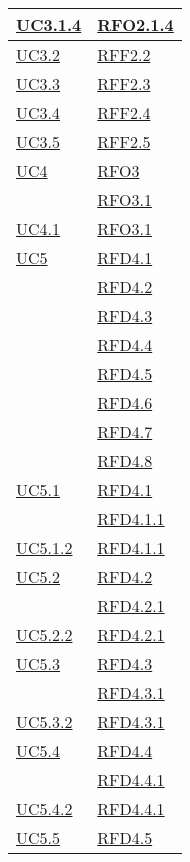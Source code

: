 \begin{longtable}{|>{\centering}m{5cm}|m{5cm}<{\centering}|}
\hyperref[UC3.1.4]{UC3.1.4} & \hyperlink{RFO2.1.4}{RFO2.1.4}\\ \hline
\hyperref[UC3.2]{UC3.2} & \hyperlink{RFF2.2}{RFF2.2}\\ \hline
\hyperref[UC3.3]{UC3.3} & \hyperlink{RFF2.3}{RFF2.3}\\ \hline
\hyperref[UC3.4]{UC3.4} & \hyperlink{RFF2.4}{RFF2.4}\\ \hline
\hyperref[UC3.5]{UC3.5} & \hyperlink{RFF2.5}{RFF2.5}\\ \hline
\hyperref[UC4]{UC4} & \hyperlink{RFO3}{RFO3}\\
& \hyperlink{RFO3.1}{RFO3.1}\\ \hline
\hyperref[UC4.1]{UC4.1} & \hyperlink{RFO3.1}{RFO3.1}\\ \hline
\hyperref[UC5]{UC5} & \hyperlink{RFD4.1}{RFD4.1}\\
& \hyperlink{RFD4.2}{RFD4.2}\\
& \hyperlink{RFD4.3}{RFD4.3}\\
& \hyperlink{RFD4.4}{RFD4.4}\\
& \hyperlink{RFD4.5}{RFD4.5}\\
& \hyperlink{RFD4.6}{RFD4.6}\\
& \hyperlink{RFD4.7}{RFD4.7}\\
& \hyperlink{RFD4.8}{RFD4.8}\\ \hline
\hyperref[UC5.1]{UC5.1} & \hyperlink{RFD4.1}{RFD4.1}\\
& \hyperlink{RFD4.1.1}{RFD4.1.1}\\ \hline
\hyperref[UC5.1.2]{UC5.1.2} & \hyperlink{RFD4.1.1}{RFD4.1.1}\\ \hline
\hyperref[UC5.2]{UC5.2} & \hyperlink{RFD4.2}{RFD4.2}\\
& \hyperlink{RFD4.2.1}{RFD4.2.1}\\ \hline
\hyperref[UC5.2.2]{UC5.2.2} & \hyperlink{RFD4.2.1}{RFD4.2.1}\\ \hline
\hyperref[UC5.3]{UC5.3} & \hyperlink{RFD4.3}{RFD4.3}\\
& \hyperlink{RFD4.3.1}{RFD4.3.1}\\ \hline
\hyperref[UC5.3.2]{UC5.3.2} & \hyperlink{RFD4.3.1}{RFD4.3.1}\\ \hline
\hyperref[UC5.4]{UC5.4} & \hyperlink{RFD4.4}{RFD4.4}\\
& \hyperlink{RFD4.4.1}{RFD4.4.1}\\ \hline
\hyperref[UC5.4.2]{UC5.4.2} & \hyperlink{RFD4.4.1}{RFD4.4.1}\\ \hline
\hyperref[UC5.5]{UC5.5} & \hyperlink{RFD4.5}{RFD4.5}\\

\end{longtable}
